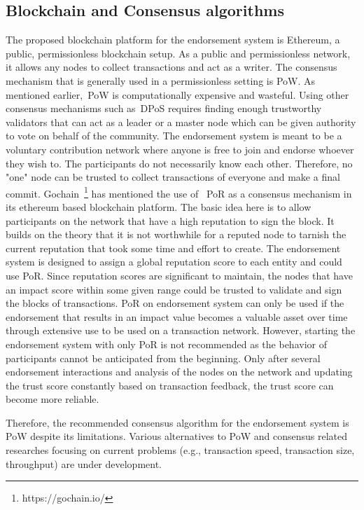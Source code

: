 \subsection{Blockchain and Consensus algorithms}\label{subsec:bcConsensus}
The proposed blockchain platform for the endorsement system is Ethereum, a
public, permissionless blockchain setup. As a public and permissionless
network, it allows any nodes to collect transactions and act as a writer. The
consensus mechanism that is generally used in a permissionless setting is
\ac{PoW}. As mentioned earlier,~\ac{PoW} is computationally expensive and
wasteful. Using other consensus mechanisms such as~\ac{DPoS} requires finding
enough trustworthy validators that can act as a leader or a master node which
can be given authority to vote on behalf of the community. The endorsement
system is meant to be a voluntary contribution network where anyone is free to
join and endorse whoever they wish to. The participants do not necessarily know
each other. Therefore, no "one" node can be trusted to collect transactions of
everyone and make a final commit. Gochain~\footnote{https://gochain.io/} has
mentioned the use of ~\ac{PoR} as a consensus mechanism in its ethereum based
blockchain platform. The basic idea here is to allow participants on the
network that have a high reputation to sign the block. It builds on the theory
that it is not worthwhile for a reputed node to tarnish the current reputation
that took some time and effort to create. The endorsement system is designed to
assign a global reputation score to each entity and could use PoR. Since
reputation scores are significant to maintain, the nodes that have an impact
score within some given range could be trusted to validate and sign the blocks
of transactions. PoR on endorsement system can only be used if the endorsement
that results in an impact value becomes a valuable asset over time through
extensive use to be used on a transaction network. However, starting the
endorsement system with only PoR is not recommended as the behavior of
participants cannot be anticipated from the beginning. Only after several
endorsement interactions and analysis of the nodes on the network and updating
the trust score constantly based on transaction feedback, the trust score can
become more reliable. \par
Therefore, the recommended consensus algorithm for the endorsement system is
\ac{PoW} despite its limitations. Various alternatives to \ac{PoW} and
consensus related researches focusing on current problems (e.g.,  transaction
speed, transaction size, throughput) are under development.
